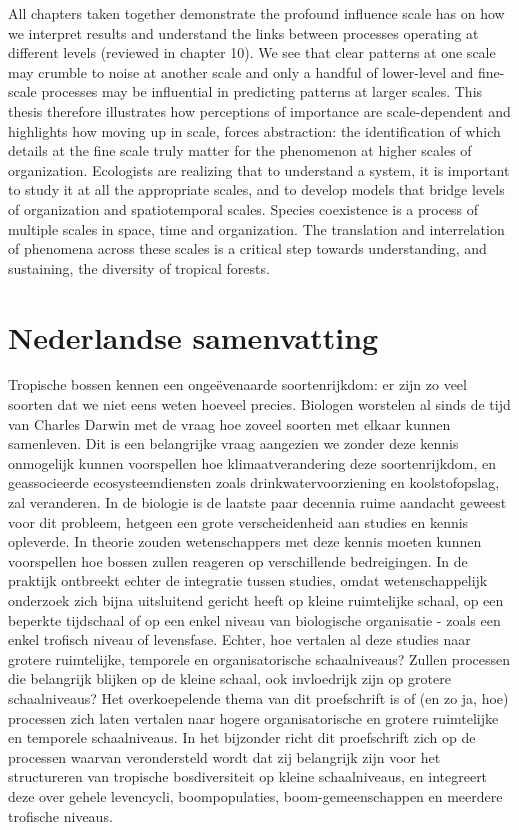 \documentclass[b5paper,justified]{tufte-book} %
\begin{document}
\begin{fullwidth}
All chapters taken together demonstrate the profound influence scale has on how we interpret results and understand the links between processes operating at different levels (reviewed in chapter 10). We see that clear patterns at one scale may crumble to noise at another scale and only a handful of lower-level and fine-scale processes may be influential in predicting patterns at larger scales. This thesis therefore illustrates how perceptions of importance are scale-dependent and highlights how moving up in scale, forces abstraction: the identification of which details at the fine scale truly matter for the phenomenon at higher scales of organization. Ecologists are realizing that to understand a system, it is important to study it at all the appropriate scales, and to develop models that bridge levels of organization and spatiotemporal scales. Species coexistence is a process of multiple scales in space, time and organization. The translation and interrelation of phenomena across these scales is a critical step towards understanding, and sustaining, the diversity of tropical forests.

\chapter{Nederlandse samenvatting} %
Tropische bossen kennen een onge\"evenaarde soortenrijkdom: er zijn zo veel soorten dat we niet eens weten hoeveel precies. Biologen worstelen al sinds de tijd van Charles Darwin met de vraag hoe zoveel soorten met elkaar kunnen samenleven. Dit is een belangrijke vraag aangezien we zonder deze kennis onmogelijk kunnen voorspellen hoe klimaatverandering deze soortenrijkdom, en geassocieerde ecosysteemdiensten zoals drinkwatervoorziening en koolstofopslag, zal veranderen. In de biologie is de laatste paar decennia ruime aandacht geweest voor dit probleem, hetgeen een grote verscheidenheid aan studies en kennis opleverde. In theorie zouden wetenschappers met deze kennis moeten kunnen voorspellen hoe bossen zullen reageren op verschillende bedreigingen. In de praktijk ontbreekt echter de integratie tussen studies, omdat wetenschappelijk onderzoek zich bijna uitsluitend gericht heeft op kleine ruimtelijke schaal, op een beperkte tijdschaal of op een enkel niveau van biologische organisatie - zoals een enkel trofisch niveau of levensfase. Echter, hoe vertalen al deze studies naar grotere ruimtelijke, temporele en organisatorische schaalniveaus? Zullen processen die belangrijk blijken op de kleine schaal, ook invloedrijk zijn op grotere schaalniveaus? Het overkoepelende thema van dit proefschrift is of (en zo ja, hoe) processen zich laten vertalen naar hogere organisatorische en grotere ruimtelijke en temporele schaalniveaus. In het bijzonder richt dit proefschrift zich op de processen waarvan verondersteld wordt dat zij  belangrijk zijn voor het structureren van tropische bosdiversiteit op kleine schaalniveaus, en integreert deze over gehele levencycli, boompopulaties, boom-gemeenschappen en meerdere trofische niveaus. 	


\end{fullwidth}
\end{document}
